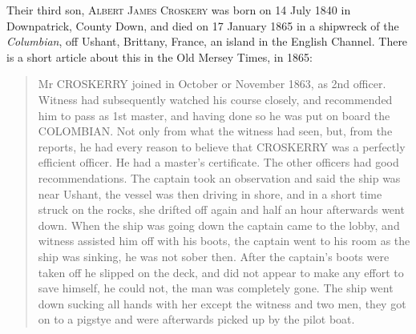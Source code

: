 Their third son, \textsc{Albert James Croskery} was born on	14 July 1840 in	Downpatrick, County Down, and died on 17 January 1865 in a shipwreck of the \textit{Columbian}, off Ushant, Brittany, France, an island in the English Channel. There is a short article about this in the Old Mersey Times, in 1865:
\begin{quotation}
Mr CROSKERRY joined in October or November 1863, as 2nd officer. Witness had subsequently watched his course closely, and recommended him to pass as 1st master, and having done so he was put on board the COLOMBIAN. Not only from what the witness had seen, but, from the reports, he had every reason to believe that CROSKERRY was a perfectly efficient officer. He had a master's certificate. The other officers had good recommendations.
The captain took an observation and said the ship was near Ushant, the vessel was then driving in shore, and in a short time struck on the rocks, she drifted off again and half an hour afterwards went down. When the ship was going down the captain came to the lobby, and witness assisted him off with his boots, the captain went to his room as the ship was sinking, he was not sober then. After the captain's boots were taken off he slipped on the deck, and did not appear to make any effort to save himself, he could not, the man was completely gone. The ship went down sucking all hands with her except the witness and two men, they got on to a pigstye and were afterwards picked up by the pilot boat.
\end{quotation}

